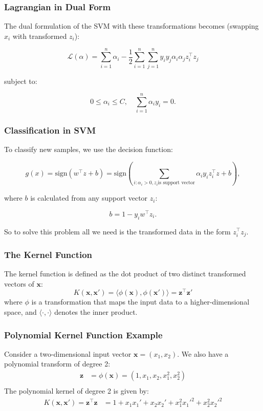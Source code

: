\subsubsection*{Lagrangian in Dual Form}

The dual formulation of the SVM with these transformations becomes (swapping $x_i$ with transformed $z_i$):

\[
\mathcal{L}(\alpha) = \sum_{i=1}^n \alpha_i - \frac{1}{2} \sum_{i=1}^n \sum_{j=1}^n y_i y_j \alpha_i \alpha_j z_i^\top z_j
\]

subject to:

\[
0 \leq \alpha_i \leq C, \quad \sum_{i=1}^n \alpha_i y_i = 0.
\]

\subsubsection*{Classification in SVM}

To classify new samples, we use the decision function:

\[
g(x) = \text{sign}(w^\top z + b)  = \text{sign} \left( \sum_{i:\alpha_i>0, z_i \text{is support vector}} \alpha_i y_i z_i^\top z + b \right),
\]

where \( b \) is calculated from any support vector \( z_i \):

\[
b = 1 - y_i w^\top z_i.
\]


So to solve this problem all we need is the transformed data in the form $z_i^\top z_j$.\\

\subsubsection*{The Kernel Function}

The kernel function is defined as the dot product of two distinct transformed vectors of $\textbf{x}$:
\begin{equation*}
    K(\mathbf{x}, \mathbf{x'}) = \langle \phi(\mathbf{x}), \phi(\mathbf{x'}) \rangle = \mathbf{z}^\top \mathbf{z}'
\end{equation*}
where $\phi$ is a transformation that maps the input data to a higher-dimensional space, and $\langle \cdot, \cdot \rangle$ denotes the inner product.

\subsubsection*{Polynomial Kernel Function Example}
Consider a two-dimensional input vector $\mathbf{x} = (x_1, x_2)$. We also have a polynomial transform of degree 2:
\begin{align*}
    \mathbf{z} &= \phi(\mathbf{x}) = (1, x_1, x_2, x_1^2, x_2^2) \\
\end{align*}
The polynomial kernel of degree 2 is given by:
\begin{align*}
    K(\mathbf{x}, \mathbf{x'}) = \mathbf{z}^\top \mathbf{z} &= 1 + x_1x_1' + x_2x_2' + x_1^2{x_1'}^2 + x_2^2{x_2'}^2
\end{align*}


